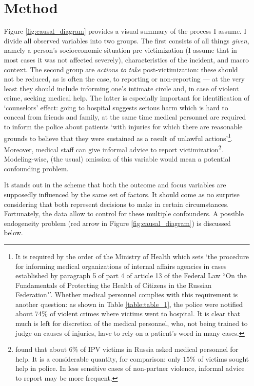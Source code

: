 \documentclass[]{interact}
\theoremstyle{plain}%
\theoremstyle{definition}
\theoremstyle{remark}
\newcommand\citet{\textcite}
\begin{document}
	\section*{Method}
	\label{sec:method}
	
	Figure \ref{fig:causal_diagram} provides a visual summary of the process I assume. I divide all observed variables into two groups. The first consists of all things \textit{given}, namely a person's socioeconomic situation pre-victimization (I assume that in most cases it was not affected severely), characteristics of the incident, and macro context. The second group are \textit{actions to take} post-victimization: these should not be reduced, as is often the case, to reporting or non-reporting --- at the very least they should include informing one's intimate circle and, in case of violent crime, seeking medical help. The latter is especially important for identification of `counselors' effect: going to hospital suggests serious harm which is hard to conceal from friends and family, at the same time medical personnel are required to inform the police about patients `with injuries for which there are reasonable grounds to believe that they were sustained as a result of unlawful actions'\footnote{It is required by the order of the Ministry of Health which sets `the procedure for informing medical organizations of internal affairs agencies in cases established by paragraph 5 of part 4 of article 13 of the Federal Law ``On the Fundamentals of Protecting the Health of Citizens in the Russian Federation"'. Whether medical personnel complies with this requirement is another question: as shown in Table \ref{table:table_1}, the police were notified about 74\% of violent crimes where victims went to hospital. It is clear that much is left for discretion of the medical personnel, who, not being trained to judge on causes of injuries, have to rely on a patient's word in many cases.}. Moreover, medical staff can give informal advice to report victimization\footnote{\citet{kamalov2023partnerskoye} found that about 6\% of IPV victims in Russia asked medical personnel for help. It is a considerable quantity, for comparison: only 15\% of victims sought help in police. In less sensitive cases of non-partner violence, informal advice to report may be more frequent.}. Modeling-wise, (the usual) omission of this variable would mean a potential confounding problem.
	
	It stands out in the scheme that both the outcome and focus variables are supposedly influenced by the same set of factors. It should come as no surprise considering that both represent decisions to make in certain circumstances. Fortunately, the data allow to control for these multiple confounders. A possible endogeneity problem (red arrow in Figure \ref{fig:causal_diagram}) is discussed below.
		
\end{document}
